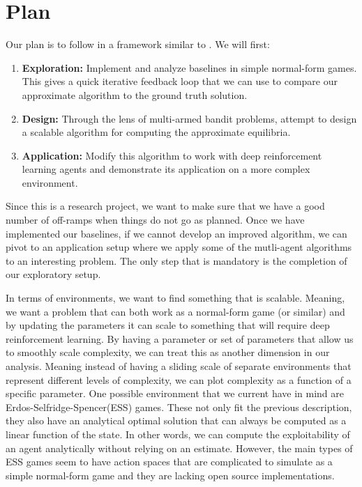 \documentclass{article}
\begin{document}
\section{Plan}
Our plan is to follow in a framework similar to \cite{dip}. We will first:
\begin{enumerate}
	\item \textbf{Exploration:} Implement and analyze baselines in simple
        normal-form games. This gives a quick iterative feedback loop that we
        can use to compare our approximate algorithm to the ground truth
        solution.
	\item \textbf{Design:} Through the lens of multi-armed bandit problems,
        attempt to design a scalable algorithm for computing the approximate
        equilibria.
    \item \textbf{Application:} Modify this algorithm to work with deep reinforcement learning agents
        and demonstrate its application on a more complex environment.
\end{enumerate}
Since this is a research project, we want to make sure that we have a good
number of off-ramps when things do not go as planned. Once we have implemented
our baselines, if we cannot develop an improved algorithm, we can pivot to an
application setup where we apply some of the mutli-agent algorithms to an
interesting problem. The only step that is mandatory is the completion of our
exploratory setup. 

In terms of environments, we want to find something that is scalable. Meaning,
we want a problem that can both work as a normal-form game (or similar) and by
updating the parameters it can scale to something that will require deep
reinforcement learning. By having a parameter or set of parameters that allow us
to smoothly scale complexity, we can treat this as another dimension in our
analysis. Meaning instead of having a sliding scale of separate environments
that represent different levels of complexity, we can plot complexity as a
function of a specific parameter. One possible environment that we current have
in mind are Erdos-Selfridge-Spencer(ESS)\cite{ESS} games. These not only fit the
previous description, they also have an analytical optimal solution that can
always be computed as a linear function of the state. In other words, we can
compute the exploitability of an agent analytically without relying on an
estimate. However, the main types of ESS games seem to have action spaces that
are complicated to simulate as a simple normal-form game and they are lacking
open source implementations.
\end{document}
